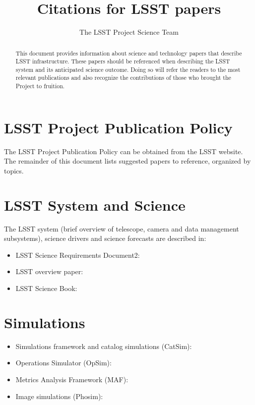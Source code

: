 \documentclass[12pt]{article}
\begin{document}
\title{Citations for LSST papers}
\author{The LSST Project Science Team}
\maketitle


\begin{abstract}
This document provides information about science and technology papers that describe LSST infrastructure.
These papers should be referenced when describing the LSST system and its anticipated science
outcome. Doing so will refer the readers to the most relevant publications and also recognize the 
contributions of those who brought the Project to fruition.
\end{abstract}


\tableofcontents

\section{LSST Project Publication Policy} 

The LSST Project Publication Policy can be obtained from the LSST website.
The remainder of this document lists suggested papers to reference, organized by topics. 


\section{LSST System and Science}

The LSST system (brief overview of telescope, camera and data management subsystems),
science drivers and science forecasts are described in:

\begin{itemize}
\item LSST Science Requirements Document2: \cite{lsstSRD}
\item LSST overview paper: \cite{ivezic2008lsst}
\item LSST Science Book: \cite{abell2009lsst}
\end{itemize}


\section{Simulations}

\begin{itemize}
\item Simulations framework and catalog simulations (CatSim): \cite{2014SPIE.9150E..14C}
\item Operations Simulator (OpSim): \cite{2014SPIE.9150E..15D}
\item Metrics Analysis Framework (MAF): \cite{2014SPIE.9149E..0BJ}
\item Image simulations (Phosim): \cite{2015arXiv150406570P}
\end{itemize}
\end{document}
